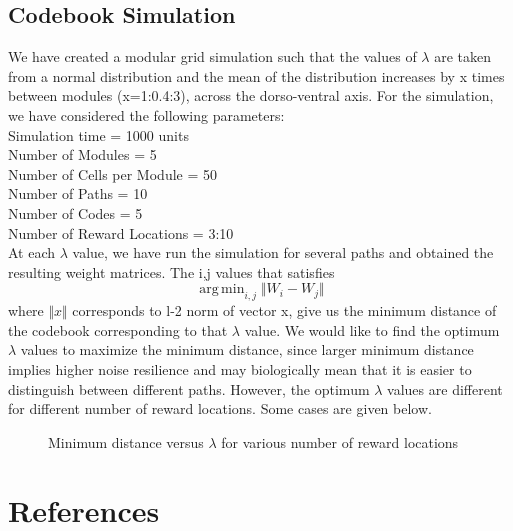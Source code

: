 \documentclass[11pt, letterpaper, onecolumn]{article}
\DeclareMathOperator*{\argmin}{arg\,min}
\begin{document}
\subsection{Codebook Simulation}
We have created a modular grid simulation such that the values of $ \lambda $ are taken from a normal distribution and the mean of the distribution increases by x times between modules (x=1:0.4:3), across the dorso-ventral axis. For the simulation, we have considered the following parameters: \\
Simulation time = 1000 units \\
Number of Modules = 5 \\
Number of Cells per Module = 50 \\
Number of Paths = 10 \\
Number of Codes = 5 \\
Number of Reward Locations = 3:10 \\

At each $ \lambda $ value, we have run the simulation for several paths and obtained the resulting weight matrices. The i,j values that satisfies
\begin{equation}
\argmin_{i,j} \Vert W_{i} - W_{j} \Vert
\end{equation}
where $ \Vert x \Vert $ corresponds to l-2 norm of vector x, give us the minimum distance of the codebook corresponding to that $ \lambda $ value. We would like to find the optimum $ \lambda $ values to maximize the minimum distance, since larger minimum distance implies higher noise resilience and may biologically mean that it is easier to distinguish between different paths. However, the optimum $ \lambda $ values are different for different number of reward locations. Some cases are given below.

\begin{figure}[H]
\centering
\caption{Minimum distance versus $ \lambda $ for various number of reward locations}
\label{fig:rewards}
\end{figure}

\newpage
\section{References}



\end{document}
